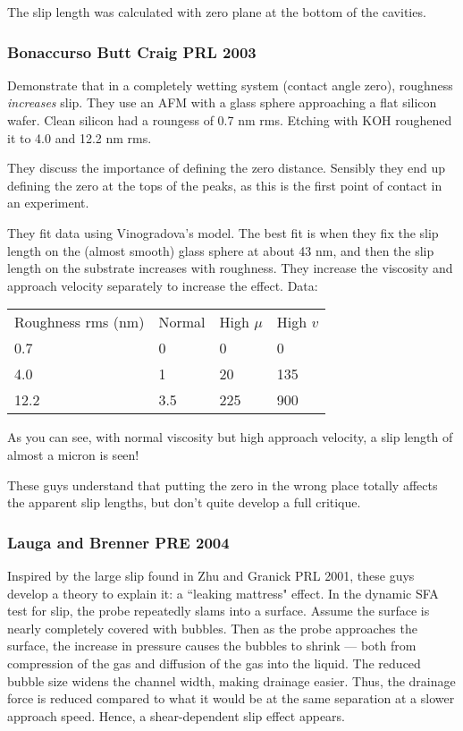 \documentclass{article}
\begin{document}
The slip length was calculated with zero plane at the bottom of the cavities.


\subsubsection*{Bonaccurso Butt Craig PRL 2003}
Demonstrate that in a completely wetting system (contact angle zero), roughness \emph{increases} slip. They use an AFM with a glass sphere approaching a flat silicon wafer. Clean silicon had a roungess of 0.7 nm rms. Etching with KOH roughened it to 4.0 and 12.2 nm rms.

They discuss the importance of defining the zero distance. Sensibly they end up defining the zero at the tops of the peaks, as this is the first point of contact in an experiment.

They fit data using Vinogradova's model. The best fit is when they fix the slip length on the (almost smooth) glass sphere at about 43 nm, and then the slip length on the substrate increases with roughness. They increase the viscosity and approach velocity separately to increase the effect. Data:

\begin{tabular}{l l l l}

Roughness rms (nm) & Normal & High $\mu$ & High $v$ \\
0.7                & 0      & 0          & 0        \\
4.0                & 1      & 20         & 135      \\
12.2               & 3.5    & 225        & 900      \\

\end{tabular}

As you can see, with normal viscosity but high approach velocity, a slip length of almost a micron is seen!

These guys understand that putting the zero in the wrong place totally affects the apparent slip lengths, but don't quite develop a full critique.

\subsubsection*{Lauga and Brenner PRE 2004}

Inspired by the large slip found in Zhu and Granick PRL 2001, these guys develop a theory to explain it: a ``leaking mattress" effect.  In the dynamic SFA test for slip, the probe repeatedly slams into a surface. Assume the surface is nearly completely covered with bubbles. Then as the probe approaches the surface, the increase in pressure causes the bubbles to shrink --- both from compression of the gas and diffusion of the gas into the liquid.  The reduced bubble size widens the channel width, making drainage easier.  Thus, the drainage force is reduced compared to what it would be at the same separation at a slower approach speed.  Hence, a shear-dependent slip effect appears.
\end{document}
